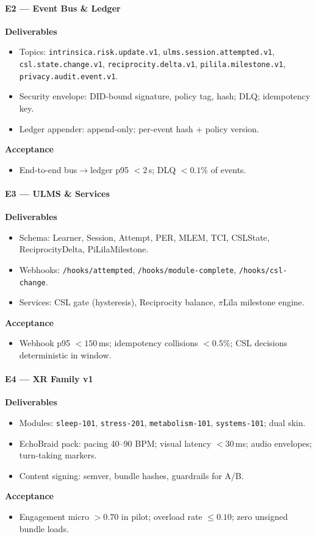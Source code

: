 \documentclass[11pt]{article}
\theoremstyle{plain}
\begin{document}
\paragraph{E2 — Event Bus \& Ledger}
\textbf{Deliverables}
\begin{itemize}
  \item Topics: \texttt{intrinsica.risk.update.v1}, \texttt{ulms.session.attempted.v1}, \texttt{csl.state.change.v1},
        \texttt{reciprocity.delta.v1}, \texttt{pilila.milestone.v1}, \texttt{privacy.audit.event.v1}.
  \item Security envelope: DID-bound signature, policy tag, hash; DLQ; idempotency key.
  \item Ledger appender: append-only; per-event hash + policy version.
\end{itemize}
\textbf{Acceptance}
\begin{itemize}
  \item End-to-end bus$\rightarrow$ledger p95 $<2$\,s; DLQ $<0.1\%$ of events.
\end{itemize}

\paragraph{E3 — ULMS \& Services}
\textbf{Deliverables}
\begin{itemize}
  \item Schema: Learner, Session, Attempt, PER, MLEM, TCI, CSLState, ReciprocityDelta, PiLilaMilestone.
  \item Webhooks: \texttt{/hooks/attempted}, \texttt{/hooks/module-complete}, \texttt{/hooks/csl-change}.
  \item Services: CSL gate (hysteresis), Reciprocity balance, $\pi$Līla milestone engine.
\end{itemize}
\textbf{Acceptance}
\begin{itemize}
  \item Webhook p95 $<150$\,ms; idempotency collisions $<0.5\%$; CSL decisions deterministic in window.
\end{itemize}

\paragraph{E4 — XR Family v1}
\textbf{Deliverables}
\begin{itemize}
  \item Modules: \texttt{sleep-101}, \texttt{stress-201}, \texttt{metabolism-101}, \texttt{systems-101}; dual skin.
  \item EchoBraid pack: pacing 40–90 BPM; visual latency $<30$\,ms; audio envelopes; turn-taking markers.
  \item Content signing: semver, bundle hashes, guardrails for A/B.
\end{itemize}
\textbf{Acceptance}
\begin{itemize}
  \item Engagement micro $>0.70$ in pilot; overload rate $\le 0.10$; zero unsigned bundle loads.
\end{itemize}
\end{document}
